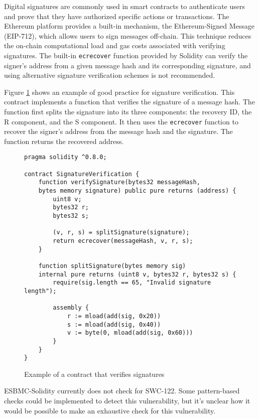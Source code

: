 Digital signatures are commonly used in smart contracts to authenticate users and prove that they have authorized specific actions or transactions. The Ethereum platform provides a built-in mechanism, the Ethereum-Signed Message (EIP-712), which allows users to sign messages off-chain. This technique reduces the on-chain computational load and gas costs associated with verifying signatures. The built-in \verb|ecrecover| function provided by Solidity can verify the signer's address from a given message hash and its corresponding signature, and using alternative signature verification schemes is not recommended.

Figure \ref{fig:signature_verification} shows an example of good practice for signature verification. This contract implements a function that verifies the signature of a message hash. The function first splits the signature into its three components: the recovery ID, the R component, and the S component. It then uses the \verb|ecrecover| function to recover the signer's address from the message hash and the signature. The function returns the recovered address.


\begin{figure}
\begin{lstlisting}
pragma solidity ^0.8.0;

contract SignatureVerification {
    function verifySignature(bytes32 messageHash,
    bytes memory signature) public pure returns (address) {
        uint8 v;
        bytes32 r;
        bytes32 s;
        
        (v, r, s) = splitSignature(signature);
        return ecrecover(messageHash, v, r, s);
    }

    function splitSignature(bytes memory sig)
    internal pure returns (uint8 v, bytes32 r, bytes32 s) {
        require(sig.length == 65, "Invalid signature length");

        assembly {
            r := mload(add(sig, 0x20))
            s := mload(add(sig, 0x40))
            v := byte(0, mload(add(sig, 0x60)))
        }
    }
}
\end{lstlisting}
\caption{Example of a contract that verifies signatures}
\label{fig:signature_verification}
\end{figure}

ESBMC-Solidity currently does not check for SWC-122. Some pattern-based checks could be implemented to detect this vulnerability, but it's unclear how it would be possible to make an exhaustive check for this vulnerability.

